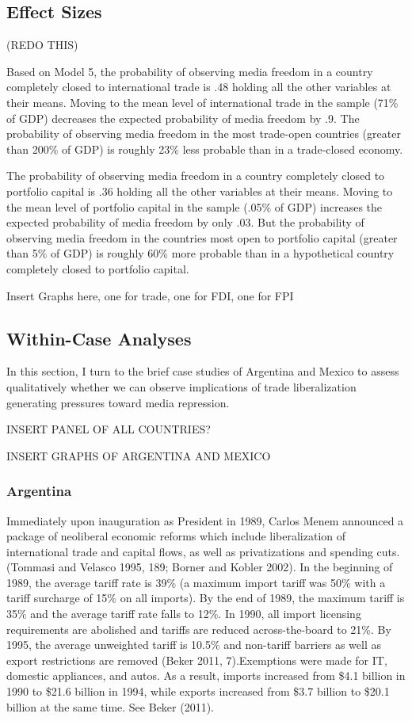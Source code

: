 \documentclass[a4paper]{article}\usepackage[]{graphicx}\usepackage[]{color}
\begin{document}
\subsection{Effect Sizes}

(REDO THIS)

Based on Model 5, the probability of observing media freedom in a country completely closed to international trade is .48 holding all the other variables at their means. Moving to the mean level of international trade in the sample (71\% of GDP) decreases the expected probability of media freedom by .9. The probability of observing media freedom in the most trade-open countries (greater than 200\% of GDP) is roughly 23\% less probable than in a trade-closed economy.

The probability of observing media freedom in a country completely closed to portfolio capital is .36 holding all the other variables at their means. Moving to the mean level of portfolio capital in the sample (.05\% of GDP) increases the expected probability of media freedom by only .03. But the probability of observing media freedom in the countries most open to portfolio capital (greater than 5\% of GDP) is roughly 60\% more probable than in a hypothetical country completely closed to portfolio capital.

Insert Graphs here, one for trade, one for FDI, one for FPI

\subsection{Within-Case Analyses}

In this section, I turn to the brief case studies of Argentina and Mexico to assess qualitatively whether we can observe implications of trade liberalization generating pressures toward media repression.

INSERT PANEL OF ALL COUNTRIES?

INSERT GRAPHS OF ARGENTINA AND MEXICO

\subsubsection{Argentina}

Immediately upon inauguration as President in 1989, Carlos Menem announced a package of neoliberal economic reforms which include liberalization of international trade and capital flows, as well as privatizations and spending cuts. (Tommasi and Velasco 1995, 189; Borner and Kobler 2002). In the beginning of 1989, the average tariff rate is 39\% (a maximum import tariff was 50\% with a tariff surcharge of 15\% on all imports). By the end of 1989, the maximum tariff is 35\% and the average tariff rate falls to 12\%. In 1990, all import licensing requirements are abolished and tariffs are reduced across-the-board to 21\%. By 1995, the average unweighted tariff is 10.5\% and non-tariff barriers as well as export restrictions are removed (Beker 2011, 7).Exemptions were made for IT, domestic appliances, and autos. As a result, imports increased from \$4.1 billion in 1990 to \$21.6 billion in 1994, while exports increased from \$3.7 billion to \$20.1 billion at the same time. See Beker (2011).
\end{document}
